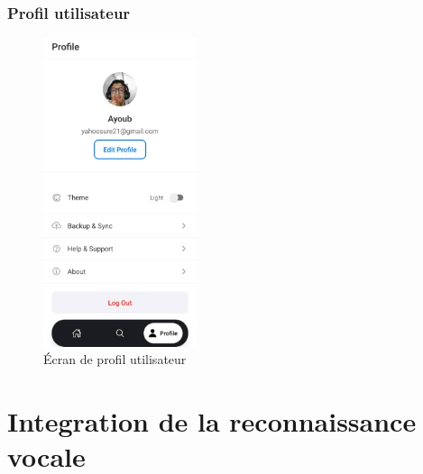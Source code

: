 \subsubsection{Profil utilisateur}
\begin{figure}[H]
    \centering
    \includegraphics[width=0.4\textwidth]{assets/docs/mobile/profile-screen.png}
    \caption{Écran de profil utilisateur}
    \label{fig:mobile-profile}
\end{figure}

\section{Integration de la reconnaissance vocale}
